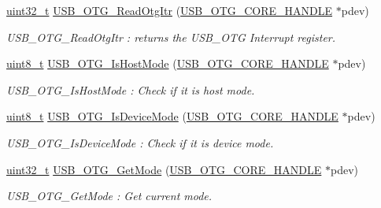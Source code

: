 \begin{DoxyCompactItemize}
\hyperlink{stdint_8h_a435d1572bf3f880d55459d9805097f62}{uint32\-\_\-t} \hyperlink{group___u_s_b___c_o_r_e___exported___functions_prototype_gafc87639da2066ccd7a2ad2eb8cbf7824}{U\-S\-B\-\_\-\-O\-T\-G\-\_\-\-Read\-Otg\-Itr} (\hyperlink{group___u_s_b___c_o_r_e___exported___types_gaf76054c11eb8a3367907aad7ae700e80}{U\-S\-B\-\_\-\-O\-T\-G\-\_\-\-C\-O\-R\-E\-\_\-\-H\-A\-N\-D\-L\-E} $\ast$pdev)
\begin{DoxyCompactList}\small\item\em U\-S\-B\-\_\-\-O\-T\-G\-\_\-\-Read\-Otg\-Itr \-: returns the U\-S\-B\-\_\-\-O\-T\-G Interrupt register. \end{DoxyCompactList}\item 
\hyperlink{stdint_8h_aba7bc1797add20fe3efdf37ced1182c5}{uint8\-\_\-t} \hyperlink{group___u_s_b___c_o_r_e___exported___functions_prototype_ga821f94371b342fe2feaedca5d8c023cf}{U\-S\-B\-\_\-\-O\-T\-G\-\_\-\-Is\-Host\-Mode} (\hyperlink{group___u_s_b___c_o_r_e___exported___types_gaf76054c11eb8a3367907aad7ae700e80}{U\-S\-B\-\_\-\-O\-T\-G\-\_\-\-C\-O\-R\-E\-\_\-\-H\-A\-N\-D\-L\-E} $\ast$pdev)
\begin{DoxyCompactList}\small\item\em U\-S\-B\-\_\-\-O\-T\-G\-\_\-\-Is\-Host\-Mode \-: Check if it is host mode. \end{DoxyCompactList}\item 
\hyperlink{stdint_8h_aba7bc1797add20fe3efdf37ced1182c5}{uint8\-\_\-t} \hyperlink{group___u_s_b___c_o_r_e___exported___functions_prototype_ga0cc90949f3d178e3b9d98e8d3e98b799}{U\-S\-B\-\_\-\-O\-T\-G\-\_\-\-Is\-Device\-Mode} (\hyperlink{group___u_s_b___c_o_r_e___exported___types_gaf76054c11eb8a3367907aad7ae700e80}{U\-S\-B\-\_\-\-O\-T\-G\-\_\-\-C\-O\-R\-E\-\_\-\-H\-A\-N\-D\-L\-E} $\ast$pdev)
\begin{DoxyCompactList}\small\item\em U\-S\-B\-\_\-\-O\-T\-G\-\_\-\-Is\-Device\-Mode \-: Check if it is device mode. \end{DoxyCompactList}\item 
\hyperlink{stdint_8h_a435d1572bf3f880d55459d9805097f62}{uint32\-\_\-t} \hyperlink{group___u_s_b___c_o_r_e___exported___functions_prototype_gadc0c08bc4072271e843b69f1101f8c09}{U\-S\-B\-\_\-\-O\-T\-G\-\_\-\-Get\-Mode} (\hyperlink{group___u_s_b___c_o_r_e___exported___types_gaf76054c11eb8a3367907aad7ae700e80}{U\-S\-B\-\_\-\-O\-T\-G\-\_\-\-C\-O\-R\-E\-\_\-\-H\-A\-N\-D\-L\-E} $\ast$pdev)
\begin{DoxyCompactList}\small\item\em U\-S\-B\-\_\-\-O\-T\-G\-\_\-\-Get\-Mode \-: Get current mode. \end{DoxyCompactList}\item 

\end{DoxyCompactItemize}
